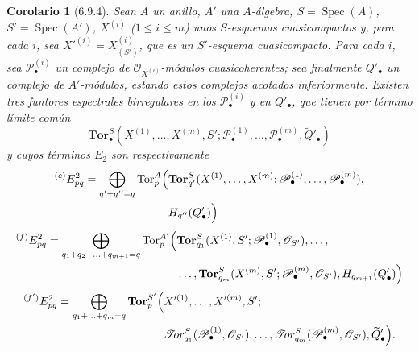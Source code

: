 \documentclass[10pt,oneside,openany]{book}
\theoremstyle{egaenv}\newtheorem*{env}{---}
\theoremstyle{egastatement}
\newtheorem*{corollary}{Corolario}
\theoremstyle{egadescription}
\renewcommand{\leq}{\leqslant}
\begin{document}
\begin{corollary}[6.9.4]
\label{III.6.9.4}
Sean $A$ un anillo, $A'$ una $A$-álgebra,
$S=\operatorname{Spec}(A)$, $S'=\operatorname{Spec}(A')$,
$X^{(i)}$ ($1\leq i\leq m$) unos $S$-esquemas cuasicompactos y, para cada
$i$, sea $X'^{(i)}=X_{(S')}^{(i)}$, que es un $S'$-esquema cuasicompacto.
Para cada $i$, sea $\mathscr P_\bullet^{(i)}$ un complejo de
$\mathscr O_{X^{(i)}}$-módulos cuasicoherentes; sea finalmente
$Q'_\bullet$ un complejo de $A'$-módulos, estando estos complejos acotados
inferiormente. Existen tres funtores espectrales birregulares en los
$\mathscr P_\bullet^{(i)}$ y en $Q'_\bullet$, que tienen por término límite
común
\[
  \mathbf{Tor}_\bullet^S
  (X^{(1)},\ldots,X^{(m)},S';
   \mathscr P_\bullet^{(1)},\ldots,\mathscr P_\bullet^{(m)},
   \widetilde{Q}'_\bullet)
\]
y cuyos términos $E_2$ son respectivamente
\[
\begin{split}
  {}^{(e)}E_{pq}^2
  =\bigoplus_{q'+q''=q}
  \operatorname{Tor}_p^A\Bigl(
  &\mathbf{Tor}_{q'}^S
  (X^{(1)},\ldots,X^{(m)};
   \mathscr P_\bullet^{(1)},\ldots,\mathscr P_\bullet^{(m)}),\\
  &H_{q''}(Q'_\bullet)
  \Bigr)
\end{split}
\]
\[
\begin{split}
  {}^{(f)}E_{pq}^2
  =\bigoplus_{q_1+q_2+\ldots+q_{m+1}=q}
  \operatorname{Tor}_p^{A'}\Bigl(
  &\mathbf{Tor}_{q_1}^S
  (X^{(1)},S';\mathscr P_\bullet^{(1)},\mathscr O_{S'}),\ldots,\\
  &\ldots,\mathbf{Tor}_{q_m}^S
  (X^{(m)},S';\mathscr P_\bullet^{(m)},\mathscr O_{S'}),
  H_{q_{m+1}}(Q'_\bullet)
  \Bigr)
\end{split}
\]
\[
\begin{split}
  {}^{(f')}E_{pq}^2
  =\bigoplus_{q_1+\ldots+q_m=q}
  \mathbf{Tor}_p^{S'}\Bigl(
  &X'^{(1)},\ldots,X'^{(m)},S';\\
  &\mathscr{T}\!or_{q_1}^S
  (\mathscr P_\bullet^{(1)},\mathscr O_{S'}),\ldots,
  \mathscr{T}\!or_{q_m}^S
  (\mathscr P_\bullet^{(m)},\mathscr O_{S'}),
  \widetilde{Q}'_\bullet
  \Bigr).
\end{split}
\]
\end{corollary}
\end{document}
